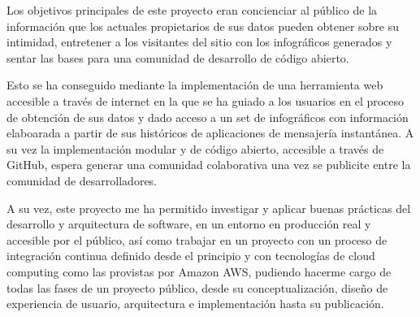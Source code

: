 
Los objetivos principales de este proyecto eran concienciar al público de la información que los actuales propietarios de sus datos pueden obtener sobre su intimidad, entretener a los visitantes del sitio con los infográficos generados y sentar las bases para una comunidad de desarrollo de código abierto.

Esto se ha conseguido mediante la implementación de una herramienta web accesible a través de internet\cite{Plataforma} en la que se ha guiado a los usuarios en el proceso de obtención de sus datos y dado acceso a un set de infográficos con información elaboarada a partir de sus históricos de aplicaciones de mensajería instantánea. A su vez la implementación modular y de código abierto, accesible a través de GitHub\cite{Repositorio}, espera generar una comunidad colaborativa una vez se publicite entre la comunidad de desarrolladores.

A su vez, este proyecto me ha permitido investigar y aplicar buenas prácticas del desarrollo y arquitectura de software, en un entorno en producción real y accesible por el público, así como trabajar en un proyecto con un proceso de integración continua definido desde el principio y con tecnologías de cloud computing como las provistas por Amazon AWS, pudiendo hacerme cargo de todas las fases de un proyecto público, desde su conceptualización, diseño de experiencia de usuario, arquitectura e implementación hasta su publicación.
